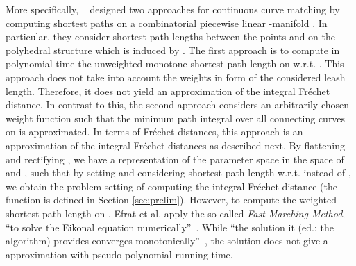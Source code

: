 \documentclass[a4paper,11pt]{article}
\begin{document}
	More specifically, ~\cite{efrat:mathching} designed two approaches for continuous curve matching by computing shortest paths on a combinatorial piecewise linear -manifold . In particular, they consider shortest path lengths between the points  and  on the polyhedral structure which is induced by . The first approach is to compute in polynomial time the unweighted monotone shortest path length on  w.r.t. . This approach does not take into account the weights in form of the considered leash length. Therefore, it does not yield an approximation of the integral Fr\'{e}chet distance. In contrast to this, the second approach considers an arbitrarily chosen weight function  such that the minimum path integral over all connecting curves on  is approximated. In terms of Fr\'{e}chet distances, this approach is an approximation of the integral Fr\'{e}chet distances as described next. By flattening and rectifying , we have a representation of the parameter space in the space of  and , such that by setting  and considering shortest path length w.r.t.  instead of , we obtain the problem setting of computing the integral Fr\'{e}chet distance (the function  is defined in Section \ref{sec:prelim}). However, to compute the weighted shortest path length on , Efrat et al. apply the so-called \emph{Fast Marching Method}, ``to solve the Eikonal equation numerically''~\cite[p. 211]{efrat:mathching}. While ``the solution it (ed.: the algorithm) provides converges monotonically''~\cite[p. 211]{efrat:mathching}, the solution does not give a  approximation with pseudo-polynomial running-time.
\end{document}
